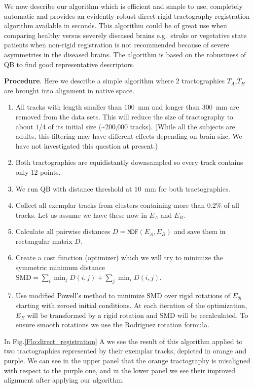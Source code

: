 \documentclass[preprint,authoryear,a4paper,10pt,onecolumn]{elsarticle}
\begin{document}
We now describe our algorithm which is efficient and simple
to use, completely automatic and provides an evidently robust direct
rigid tractography registration algorithm available in seconds. This
algorithm could be of great use when comparing healthy versus severely
diseased brains e.g.~stroke or vegetative state patients when non-rigid
registration is not recommended because of severe asymmetries in the
diseased brains. The algorithm is based on the robustness of QB to find
good representative descriptors.

\textbf{Procedure}. Here we describe a simple algorithm where $2$
tractographies $T_{A}$,$T_{B}$ are brought into alignment in native
space.
\begin{enumerate}
\item All tracks with length smaller than $100$~mm and longer than $300$~mm
are removed from the data sets. This will reduce the size of tractography
to about $1/4$ of its initial size (\textasciitilde200,000 tracks). (While all
the subjects are adults, this filtering may have different effects
depending on brain size. We have not investigated this question at
present.)
\item Both tractographies are equidistantly downsampled so every track contains
only $12$ points. 
\item We run QB with distance threshold at $10$~mm for both tractographies.
\item Collect all exemplar tracks from clusters containing more than $0.2\%$
of all tracks. Let us assume we have these now in $E_{A}$ and $E_{B}$.
\item Calculate all pairwise distances $D=\mathtt{MDF}(E_{A},E_{B})$ and
save them in rectangular matrix $D$. 
\item Create a cost function (optimizer) which we will try to minimize the
symmetric minimum distance $\mathrm{SMD}=\sum_{i}\min_{j}D(i,j)+\sum_{j}\min_{i}D(i,j).$
\item Use modified Powell's method \citep{fletcher1987practical} to minimize
$\mathrm{SMD}$ over rigid rotations of $E_{\mathcal{B}}$ starting
with zeroed initial conditions. At each iteration of the optimization,
$E_{B}$ will be transformed by a rigid rotation and $\mathrm{SMD}$
will be recalculated. To ensure smooth rotations we use the Rodriguez
rotation formula.
\end{enumerate}

In Fig.\ref{Flo:direct_registration} A we see the result of this
algorithm applied to two tractographies represented by their
exemplar tracks, depicted in orange and purple. We can see in the
upper panel that the orange tractography is misaligned with respect to
the purple one, and in the lower panel we see their improved alignment
after applying our algorithm.
\end{document}
